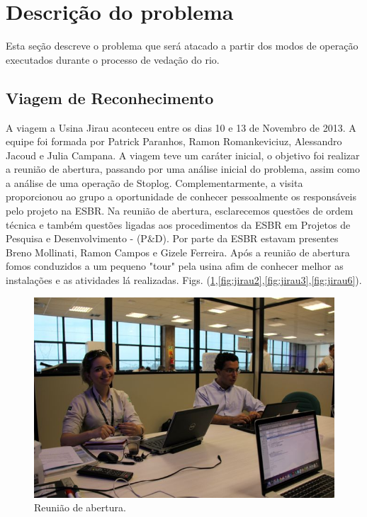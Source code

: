

\section{Descrição do problema}
Esta seção descreve o problema que será atacado a partir dos modos de operação
executados durante o processo de vedação do rio.

\subsection{Viagem de Reconhecimento}
A viagem a Usina Jirau aconteceu entre os dias 10 e 13 de Novembro de 2013. A
equipe foi formada por Patrick Paranhos, Ramon Romankeviciuz, Alessandro Jacoud
e Julia Campana. A viagem teve um caráter inicial, o objetivo foi realizar a
reunião de abertura, passando por  uma análise inicial do problema, assim como a
análise de uma operação de Stoplog. Complementarmente, a visita proporcionou ao
grupo a oportunidade de conhecer pessoalmente os responsáveis pelo projeto na
ESBR.
Na reunião de abertura, esclarecemos questões de ordem técnica e também questões
ligadas aos procedimentos da ESBR em Projetos de Pesquisa e Desenvolvimento -
(P$\&$D).  Por parte da ESBR estavam presentes Breno Mollinati, Ramon Campos e
Gizele Ferreira. Após a reunião de abertura fomos conduzidos a um pequeno "tour"
pela usina afim de conhecer melhor as instalações e as atividades lá realizadas.
Figs.
(\ref{fig:jirau1},\ref{fig:jirau2},\ref{fig:jirau3},\ref{fig:jirau6}).

 \begin{figure}[ht!]
    \centering \includegraphics[width=0.6\columnwidth]{figs/jirau/jirau_01}
    \caption{Reunião de abertura.}
    \label{fig:jirau1}
\end{figure}

